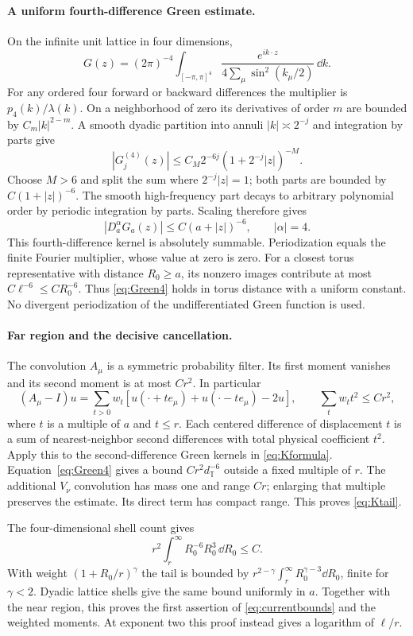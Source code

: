\documentclass[11pt,letterpaper]{article}
\numberwithin{equation}{section}
\theoremstyle{definition}\newtheorem{definition}[theorem]{Definition}
\theoremstyle{remark}\newtheorem{remark}[theorem]{Remark}
\begin{document}
\paragraph{A uniform fourth-difference Green estimate.}
On the infinite unit lattice in four dimensions,
\[
 G(z)=(2\pi)^{-4}\int_{[-\pi,\pi]^4}
       \frac{e^{ik\cdot z}}{4\sum_\mu\sin^2(k_\mu/2)}\,\dd k.
\]
For any ordered four forward or backward differences the multiplier is $p_4(k)/\lambda(k)$. On a neighborhood of zero its derivatives of order $m$ are bounded by $C_m|k|^{2-m}$. A smooth dyadic partition into annuli $|k|\asymp2^{-j}$ and integration by parts give
\[
 |G_j^{(4)}(z)|\le C_M2^{-6j}(1+2^{-j}|z|)^{-M}.
\]
Choose $M>6$ and split the sum where $2^{-j}|z|=1$; both parts are bounded by $C(1+|z|)^{-6}$. The smooth high-frequency part decays to arbitrary polynomial order by periodic integration by parts. Scaling therefore gives
\begin{equation}
 |D_a^\alpha G_a(z)|\le C(a+|z|)^{-6},\qquad |\alpha|=4.
 \label{eq:Green4}
\end{equation}
This fourth-difference kernel is absolutely summable. Periodization equals the finite Fourier multiplier, whose value at zero is zero. For a closest torus representative with distance $R_0\ge a$, its nonzero images contribute at most $C\ell^{-6}\le CR_0^{-6}$. Thus \eqref{eq:Green4} holds in torus distance with a uniform constant. No divergent periodization of the undifferentiated Green function is used.

\paragraph{Far region and the decisive cancellation.}
The convolution $A_\mu$ is a symmetric probability filter. Its first moment vanishes and its second moment is at most $Cr^2$. In particular
\[
 (A_\mu-I)u=\sum_{t>0}w_t
 [u(\cdot+te_\mu)+u(\cdot-te_\mu)-2u],\qquad
 \sum_tw_tt^2\le Cr^2,
\]
where $t$ is a multiple of $a$ and $t\le r$. Each centered difference of displacement $t$ is a sum of nearest-neighbor second differences with total physical coefficient $t^2$. Apply this to the second-difference Green kernels in \eqref{eq:Kformula}. Equation~\eqref{eq:Green4} gives a bound $Cr^2d_{\mathbb T}^{-6}$ outside a fixed multiple of $r$. The additional $V_\nu$ convolution has mass one and range $Cr$; enlarging that multiple preserves the estimate. Its direct term has compact range. This proves \eqref{eq:Ktail}.

The four-dimensional shell count gives
\[
 r^2\int_r^\infty R_0^{-6}R_0^3\,\dd R_0\le C.
\]
With weight $(1+R_0/r)^\gamma$ the tail is bounded by
$r^{2-\gamma}\int_r^\infty R_0^{\gamma-3}\dd R_0$, finite for $\gamma<2$. Dyadic lattice shells give the same bound uniformly in $a$. Together with the near region, this proves the first assertion of \eqref{eq:currentbounds} and the weighted moments. At exponent two this proof instead gives a logarithm of $\ell/r$.
\end{document}
